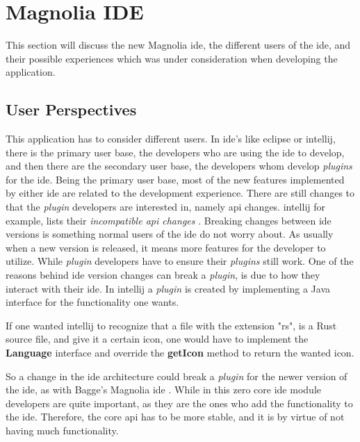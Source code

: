 \chapter{Magnolia IDE} \label{cha:ide}

This section will discuss the new Magnolia \gls{ide}, the different users of the
\gls{ide}, and their possible experiences which was under consideration when
developing the application.

\section{User Perspectives}

This application has to consider different users. In \gls{ide}'s like
\gls{eclipse} or \gls{intellij}, there is the primary user base, the developers
who are using the \gls{ide} to develop, and then there are the secondary user
base, the developers whom develop \textit{plugins} for the \gls{ide}. Being the
primary user base, most of the new features implemented by either \gls{ide} are
related to the development experience. There are still changes to that the
\textit{plugin} developers are interested in, namely \gls{api} changes.
\gls{intellij} for example, lists their \textit{incompatible \gls{api} changes}
\cite{intellijBrokenApi}. Breaking changes between \gls{ide} versions is
something normal users of the \gls{ide} do not worry about. As usually when a new
version is released, it means more features for the developer to utilize. While
\textit{plugin} developers have to ensure their \textit{plugins} still work. One
of the reasons behind \gls{ide} version changes can break a \textit{plugin}, is
due to how they interact with their \gls{ide}. In \gls{intellij} a
\textit{plugin} is created by implementing a Java interface for the functionality
one wants.

If one wanted \gls{intellij} to recognize that a file with the extension "rs",
is a Rust source file, and give it a certain icon, one would have to implement
the \textbf{Language} interface and override the \textbf{getIcon} method to
return the wanted icon.

So a change in the \gls{ide} architecture could break a \textit{plugin} for the
newer version of the \gls{ide}, as with Bagge's Magnolia \gls{ide}
\cite{baggeIde}. While in this zero core \gls{ide} module developers are quite
important, as they are the ones who add the functionality to the \gls{ide}.
Therefore, the core \gls{api} has to be more stable, and it is by virtue of not
having much functionality.

